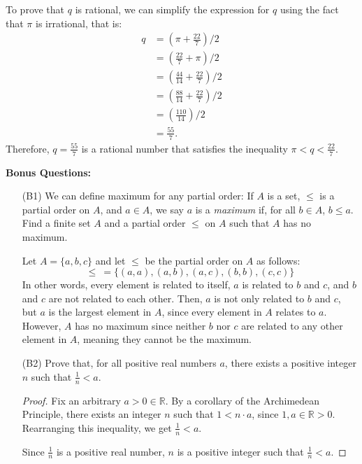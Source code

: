 \documentclass{article}
\begin{document}
\begin{enumerate}
                To prove that $q$ is rational, we can simplify the expression for $q$ using the fact that $\pi$ is irrational, that is:
                \begin{align*}
                    q &= (\pi + \frac{22}{7}) / 2 \\
                    &= (\frac{22}{7} + \pi) / 2 \\
                    &= (\frac{44}{14} + \frac{22}{7}) / 2 \\
                    &= (\frac{88}{14} + \frac{22}{7}) / 2 \\
                    &= (\frac{110}{14}) / 2 \\
                    &= \frac{55}{7}.
                \end{align*}
                Therefore, $q = \frac{55}{7}$ is a rational number that satisfies the inequality $\pi < q < \frac{22}{7}$.
            
    \end{enumerate}

    \newpage
    \textbf{Bonus Questions:}
    
    \begin{itemize}

    	\item [(B1)] We can define maximum for any partial order: If $A$ is a set, $\leq$ is a partial order on $A$, and $a \in A$, we say $a$ is a \emph{maximum} if, for all $b \in A$, $b \le a$.  Find a finite set $A$ and a partial order $\leq$ on $A$ such that $A$ has no maximum.\\\par\quad
                Let $A = \{ a, b, c \}$ and let $\le$ be the partial order on $A$ as follows:
                \[
                    \le \ = \{ (a, a), (a, b), (a, c), (b, b), (c, c) \}
                \]
                In other words, every element is related to itself, $a$ is related to $b$ and $c$, and $b$ and $c$ are not related to each other. Then, $a$ is not only related to $b$ and $c$, but $a$ is the largest element in $A$, since every element in $A$ relates to $a$. However, $A$ has no maximum since neither $b$ nor $c$ are related to any other element in $A$, meaning they cannot be the maximum. 

            \item [(B2)] Prove that, for all positive real numbers $a$, there exists a positive integer $n$ such that $\frac{1}{n} < a$.
                \begin{proof}
                   Fix an arbitrary $a > 0 \in\mathbb{R}$. By a corollary of the Archimedean Principle, there exists an integer $n$ such that $1 < n\cdot a$, since $1, a \in\mathbb{R} > 0$. Rearranging this inequality, we get $\frac{1}{n} < a$. \par

                   Since $\frac{1}{n}$ is a positive real number, $n$ is a positive integer such that $\frac{1}{n} < a$.
                \end{proof}
    \end{itemize}
\end{document}
